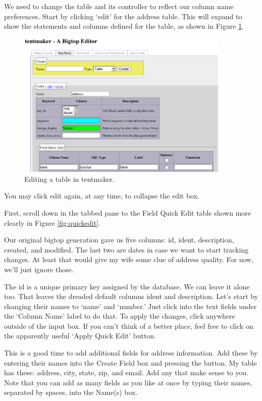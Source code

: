 We need to change the table and its controller to reflect our column
name preferences.  Start by clicking `edit' for the address table.
This will expand to show the statements and columns defined for the
table, as shown in Figure \ref{fig:tableedit}.

\begin{figure}
\includegraphics[width=4in]{tableedit}
\caption{Editing a table in tentmaker.}
\label{fig:tableedit}
\end{figure}

You may click edit again, at any time, to collapse the edit box.

First, scroll down in the tabbed pane to the Field Quick Edit
table shown more clearly in Figure \ref{fig:quickedit}.

Our original bigtop generation gave us five columns: id, ident, description,
created, and modified.  The last two are dates in case we want to start
tracking changes.  At least that would give my wife some clue of
address quality.  For now, we'll just ignore those.

The id is a unique primary key assigned by the database.  We can leave
it alone too.  That leaves the dreaded default columns ident and description.
Let's start by changing their names to `name' and `number.'  Just click
into the text fields under the `Column Name' label to do that.  To apply the
changes, click anywhere outside of the input box.  If you can't think
of a better place, feel free to click on the apparently useful
`Apply Quick Edit' button.

This is a good time to add additional fields for address information.
Add these by entering their names into the Create Field box and pressing
the button.  My table has these: address, city, state, zip, and email.
Add any that make sense to you.  Note that you can add as many fields as you
like at once by typing their names, separated by spaces, into the Name(s)
box.


